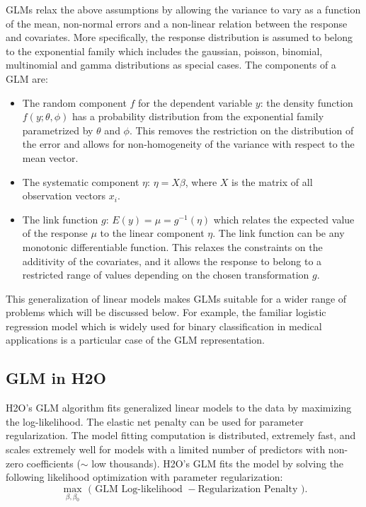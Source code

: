 GLMs relax the above assumptions by allowing the variance to vary as a function of the mean, non-normal errors and a non-linear relation between the response and covariates. More specifically, the response distribution is assumed to belong to the exponential family which includes the gaussian, poisson, binomial, multinomial and gamma distributions as special cases. The components of a GLM are:
\begin{itemize}
\item The random component $f$ for the dependent variable $y$: the density function $f(y;\theta,\phi)$ has a probability distribution from the exponential family parametrized by $\theta$ and $\phi$. This removes the restriction on the distribution of the error and allows for non-homogeneity of the variance with respect to the mean vector.
\item The systematic component $\eta$: $\eta = X\beta$, where $X$ is the matrix of all observation vectors $x_i$.
\item The link function $g$: $E(y) = \mu = g^{-1}(\eta)$ which relates the expected value of the response $\mu$ to the linear component $\eta$. The link function can be any monotonic differentiable function. This relaxes the constraints on the additivity of the covariates, and it allows the response to belong to a restricted range of values depending on the chosen transformation $g$.
\end{itemize}


This generalization of linear models makes GLMs suitable for a wider range of problems which will be discussed below. For example, the familiar logistic regression model which is widely used for binary classification in medical applications is a particular case of the GLM representation. 


\subsection{GLM in H2O}
H2O's GLM algorithm fits generalized linear models to the data by maximizing the log-likelihood. The elastic net penalty can be used for parameter regularization. The model fitting computation is distributed, extremely fast, and scales extremely well for models with a limited number of predictors with non-zero coefficients ($\mathtt{\sim}$ low thousands).  H2O's GLM fits the model by solving the following likelihood optimization with parameter regularization:
 $$\max_{\beta,\beta_0} \mbox{  ( GLM Log-likelihood }  - \mbox{Regularization Penalty )} .$$

